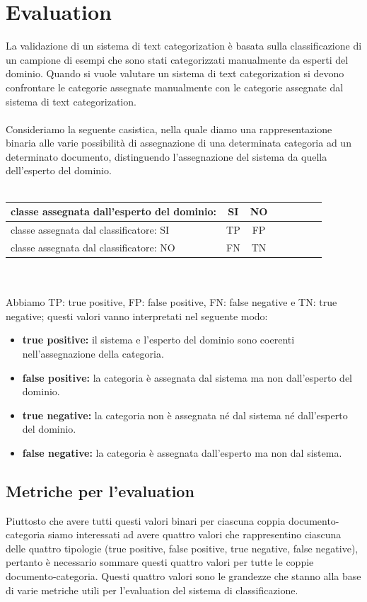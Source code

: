 \documentclass{article}
\theoremstyle{plain}
\theoremstyle{definition}
\begin{document}
\section{Evaluation}
La validazione di un sistema di text categorization è basata sulla classificazione di un campione di esempi che sono stati categorizzati manualmente da esperti del dominio. Quando si vuole valutare un sistema di text categorization si devono confrontare le categorie assegnate manualmente con le categorie assegnate dal sistema di text categorization.
\\
\\
Consideriamo la seguente casistica, nella quale diamo una rappresentazione binaria alle varie possibilità di assegnazione di una determinata categoria ad un determinato documento, distinguendo l'assegnazione del sistema da quella dell'esperto del dominio.
\\
\\
\begin{tabular}{l*{6}{c}r}
classe assegnata dall'esperto del dominio:  & SI & NO \\
\hline
classe assegnata dal classificatore: SI & TP & FP \\
classe assegnata dal classificatore: NO & FN & TN \\
\end{tabular}
\\
\\
Abbiamo TP: true positive, FP: false positive, FN: false negative e TN: true negative; questi valori vanno interpretati nel seguente modo:
\begin{itemize}
\item \textbf{true positive:} il sistema e l'esperto del dominio sono coerenti nell'assegnazione della categoria.
\item \textbf{false positive:} la categoria è assegnata dal sistema ma non dall'esperto del dominio.
\item  \textbf{true negative:} la categoria non è assegnata né dal sistema né dall'esperto del dominio.
\item \textbf{false negative:} la categoria è assegnata dall'esperto ma non dal sistema.
\end{itemize}


\subsection{Metriche per l'evaluation}
Piuttosto che avere tutti questi valori binari per ciascuna coppia documento-categoria siamo interessati ad avere quattro valori che rappresentino ciascuna delle quattro tipologie (true positive, false positive, true negative, false negative), pertanto è necessario sommare questi quattro valori per tutte le coppie documento-categoria. Questi quattro valori sono le grandezze che stanno alla base di varie metriche utili per l'evaluation del sistema di classificazione.
\end{document}
